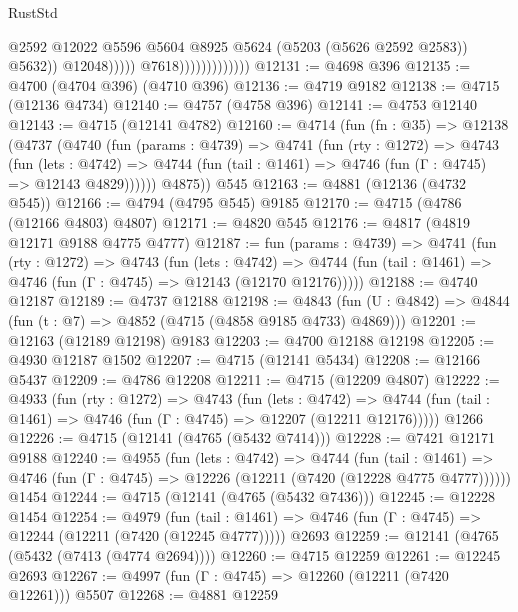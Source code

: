 \begin{lexlean}{RustStd}
\begin{coremodule}
                                            @2592
                                            @12022
                                            @5596
                                            @5604
                                            @8925
                                            @5624
                                            (@5203 (@5626 @2592 @2583))
                                            @5632))
                                        @12048)))))
                              @7618)))))))))))))
@12131 := @4698 @396
@12135 := @4700 (@4704 @396) (@4710 @396)
@12136 := @4719 @9182
@12138 := @4715 (@12136 @4734)
@12140 := @4757 (@4758 @396)
@12141 := @4753 @12140
@12143 := @4715 (@12141 @4782)
@12160 := @4714
    (fun (fn : @35) =>
    @12138
      (@4737
        (@4740
          (fun (params : @4739) =>
          @4741
            (fun (rty : @1272) =>
            @4743
              (fun (lets : @4742) =>
              @4744 (fun (tail : @1461) => @4746 (fun (Γ : @4745) => @12143 @4829))))))
        @4875))
    @545
@12163 := @4881 (@12136 (@4732 @545))
@12166 := @4794 (@4795 @545) @9185
@12170 := @4715 (@4786 (@12166 @4803) @4807)
@12171 := @4820 @545
@12176 := @4817 (@4819 @12171 @9188 @4775 @4777)
@12187 := fun (params : @4739) =>
  @4741
    (fun (rty : @1272) =>
    @4743
      (fun (lets : @4742) =>
      @4744 (fun (tail : @1461) => @4746 (fun (Γ : @4745) => @12143 (@12170 @12176)))))
@12188 := @4740 @12187
@12189 := @4737 @12188
@12198 := @4843 (fun (U : @4842) => @4844 (fun (t : @7) => @4852 (@4715 (@4858 @9185 @4733) @4869)))
@12201 := @12163 (@12189 @12198) @9183
@12203 := @4700 @12188 @12198
@12205 := @4930 @12187 @1502
@12207 := @4715 (@12141 @5434)
@12208 := @12166 @5437
@12209 := @4786 @12208
@12211 := @4715 (@12209 @4807)
@12222 := @4933
    (fun (rty : @1272) =>
    @4743
      (fun (lets : @4742) =>
      @4744 (fun (tail : @1461) => @4746 (fun (Γ : @4745) => @12207 (@12211 @12176)))))
    @1266
@12226 := @4715 (@12141 (@4765 (@5432 @7414)))
@12228 := @7421 @12171 @9188
@12240 := @4955
    (fun (lets : @4742) =>
    @4744
      (fun (tail : @1461) =>
      @4746 (fun (Γ : @4745) => @12226 (@12211 (@7420 (@12228 @4775 @4777))))))
    @1454
@12244 := @4715 (@12141 (@4765 (@5432 @7436)))
@12245 := @12228 @1454
@12254 := @4979
    (fun (tail : @1461) => @4746 (fun (Γ : @4745) => @12244 (@12211 (@7420 (@12245 @4777)))))
    @2693
@12259 := @12141 (@4765 (@5432 (@7413 (@4774 @2694))))
@12260 := @4715 @12259
@12261 := @12245 @2693
@12267 := @4997 (fun (Γ : @4745) => @12260 (@12211 (@7420 @12261))) @5507
@12268 := @4881 @12259

\end{coremodule}
\end{lexlean}
